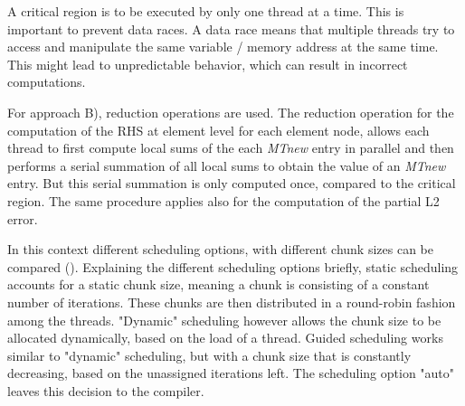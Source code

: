 A critical region is to be executed by only one thread at a time. This is important to prevent data races. A data race means that multiple threads try to access and manipulate the same variable / memory address at the same time. This might lead to unpredictable behavior, which can result in incorrect computations. 

For approach B), reduction operations are used. The reduction operation for the computation of the RHS at element level for each element node, allows each thread to first compute local sums of the each \textit{MTnew} entry in parallel and then performs a serial summation of all local sums to obtain the value of an \textit{MTnew} entry. But this serial summation is only computed once, compared to the critical region. The same procedure applies also for the computation of the partial L2 error. 

In this context different scheduling options, with different chunk sizes can be compared (). Explaining the different scheduling options briefly, static scheduling accounts for a static chunk size, meaning a chunk is consisting of a constant number of iterations. These chunks are then distributed in a round-robin fashion among the threads. "Dynamic" scheduling however allows the chunk size to be allocated dynamically, based on the load of a thread. Guided scheduling works similar to "dynamic" scheduling, but with a chunk size that is constantly decreasing, based on the unassigned iterations left. The scheduling option "auto" leaves this decision to the compiler.
\newpage

